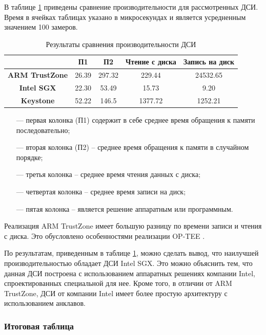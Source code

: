 В таблице \ref{table:perf} приведены сравнение производительности для рассмотренных ДСИ. Время в ячейках таблицах указано в микросекундах и является усредненным значением 100 замеров.

\begin{table}[!htb]
	\begin{center}
		\caption{Результаты сравнения производительности ДСИ}
		\label{table:perf}
		\begin{tabular}{|c|c|c|c|c|}
			\hline
			& \bfseries П1 & \bfseries П2  & \bfseries Чтение с диска & \bfseries Запись на диск\\
			\hline
			\bfseries ARM TrustZone & 26.39 & 297.32 & 229.44 & 24532.65 \\ \hline
			\bfseries Intel SGX & 22.30 & 53.49 & 15.73 & 9.20 \\ \hline
			\bfseries Keystone & 52.22 & 146.5 & 1377.72 & 1252.21 \\ \hline	
		\end{tabular}
	\end{center}
\end{table}

\begin{itemize}
	\item [---] первая колонка (П1) содержит в себе среднее время обращения к памяти последовательно;
	\item [---] вторая колонка (П2) -- среднее время обращения к памяти в случайном порядке;
	\item [---] третья колонка -- среднее время чтения данных с диска;
	\item [---] четвертая колонка -- среднее время записи на диск;
	\item [---] пятая колонка -- является решение аппаратным или программным.
\end{itemize}

Реализация ARM TrustZone имеет большую разницу по времени записи и чтения с диска. Это обусловлено особенностями реализации OP-TEE \cite{comparsion-perf}.

По результатам, приведенным в таблице \ref{table:perf}, можно сделать вывод, что наилучшей производительностью обладает ДСИ Intel SGX. Это можно объяснить тем, что данная ДСИ построена с использованием аппаратных решениях компании Intel, спроектированных специальной для нее. Кроме того, в отличии от ARM TrustZone, ДСИ от компании Intel имеет более простую архитектуру с использованием анклавов.

\subsubsection{Итоговая таблица}

